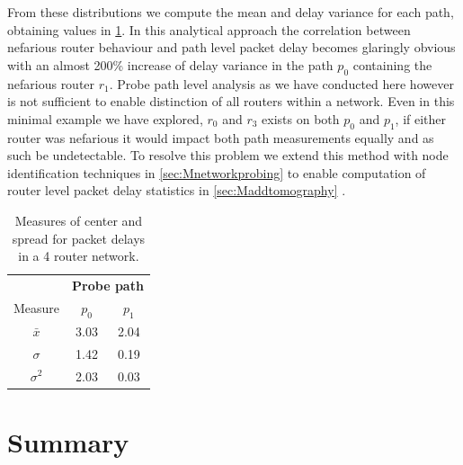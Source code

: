 From these distributions we compute the mean and delay variance for each path, obtaining values in \cref{tbl:4routerstats}. In this analytical approach the correlation between nefarious router behaviour and path level packet delay becomes glaringly obvious with an almost 200\% increase of delay variance in the path $p_0$ containing the nefarious router $r_1$. Probe path level analysis as we have conducted here however is not sufficient to enable distinction of all routers within a network. Even in this minimal example we have explored, $r_0$ and $r_3$ exists on both $p_0$ and $p_1$, if either router was nefarious it would impact both path measurements equally and as such be undetectable. To resolve this problem we extend this method with node identification techniques in \cref{sec:Mnetworkprobing} to enable computation of router level packet delay statistics in \cref{sec:Maddtomography} .
\begin{table}[H]
    \centering
    \begin{tabular}{@{}ccc@{}}
        \toprule
        & \multicolumn{2}{c}{\textbf{Probe path}}\\
        \cmidrule(lr){2-3}
        Measure & $p_0$ & $p_1$ \\
        \midrule
        $\bar{x}$   & 3.03 & 2.04 \\
        $\sigma$    & 1.42 & 0.19 \\
        $\sigma^2$  & 2.03 & 0.03 \\
        \bottomrule
    \end{tabular}
    \caption{Measures of center and spread for packet delays in a 4 router network.}
    \label{tbl:4routerstats}
\end{table}

\section{Summary}
\label{sec:Iintroductionsummary}

